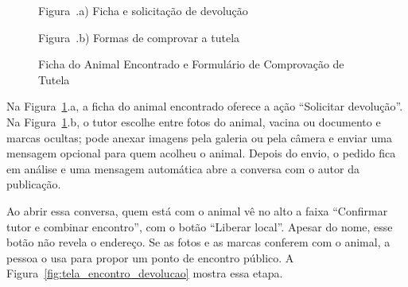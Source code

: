 \begin{figure}[H]
    \centering
    \caption{Ficha do Animal Encontrado e Formulário de Comprovação de Tutela}
    \label{fig:tela_comprovacao_tutela}
    \vspace{0.15cm}
    \begin{minipage}[t]{0.46\textwidth}
        \centering
        \par\vspace{0.12cm}
        {\small Figura~\thefigure.a) Ficha e solicitação de devolução}
    \end{minipage}
    \hspace{0.06\textwidth}
    \begin{minipage}[t]{0.46\textwidth}
        \centering
        \par\vspace{0.12cm}
        {\small Figura~\thefigure.b) Formas de comprovar a tutela}
    \end{minipage}
    \par\vspace{0.12cm}
\end{figure}

Na Figura~\ref{fig:tela_comprovacao_tutela}.a, a ficha do animal encontrado oferece a ação ``Solicitar devolução''. Na Figura~\ref{fig:tela_comprovacao_tutela}.b, o tutor escolhe entre fotos do animal, vacina ou documento e marcas ocultas; pode anexar imagens pela galeria ou pela câmera e enviar uma mensagem opcional para quem acolheu o animal. Depois do envio, o pedido fica em análise e uma mensagem automática abre a conversa com o autor da publicação.

Ao abrir essa conversa, quem está com o animal vê no alto a faixa ``Confirmar tutor e combinar encontro'', com o botão ``Liberar local''. Apesar do nome, esse botão não revela o endereço. Se as fotos e as marcas conferem com o animal, a pessoa o usa para propor um ponto de encontro público. A Figura~\ref{fig:tela_encontro_devolucao} mostra essa etapa.

